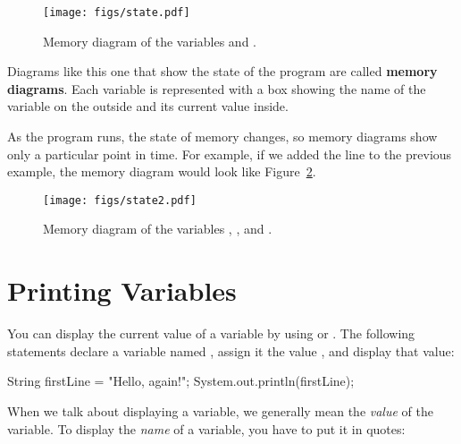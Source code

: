 \begin{figure}[!ht]
\begin{center}
\texttt{[image: figs/state.pdf]}
\caption{Memory diagram of the variables  and .}
\label{fig.state}
\end{center}
\end{figure}


Diagrams like this one that show the state of the program are called {\bf memory diagrams}.
Each variable is represented with a box showing the name of the variable on the outside and its current value inside.

As the program runs, the state of memory changes, so memory diagrams show only a particular point in time.
For example, if we added the line  to the previous example, the memory diagram would look like Figure~\ref{fig.state2}.

\begin{figure}[!ht]
\begin{center}
\texttt{[image: figs/state2.pdf]}
\caption{Memory diagram of the variables , , and .}
\label{fig.state2}
\end{center}
\end{figure}


\section{Printing Variables}
\label{sec:printvar}

You can display the current value of a variable by using  or .
The following statements declare a variable named , assign it the value , and display that value:

\begin{code}
String firstLine = "Hello, again!";
System.out.println(firstLine);
\end{code}

%

When we talk about displaying a variable, we generally mean the {\em value} of the variable.
To display the {\em name} of a variable, you have to put it in quotes:

